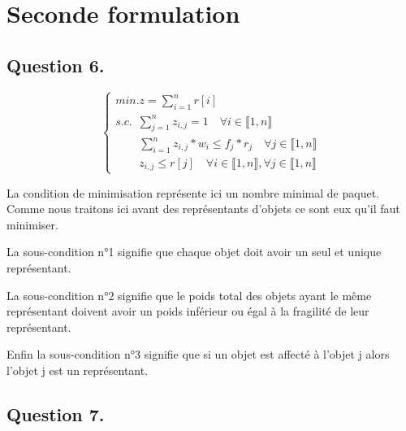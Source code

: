 \section{Seconde formulation}\label{sec:2_form}

\subsection*{Question 6.}

\begin{equation}
    \begin{cases}
        min. z = \sum_{i = 1}^{n} r[i]\\
        s.c. \hspace{6pt}\sum_{j = 1}^{n} z_{i,j} = 1 \hspace{12pt} \forall i \in \llbracket  1, n \rrbracket\\
        \hspace{25pt}\sum_{i = 1}^{n} z_{i, j}*w_i \leq f_j*r_j \hspace{12pt} \forall j \in \llbracket  1, n \rrbracket\\
        \hspace{25pt}z_{i, j} \leq r[j] \hspace{12pt} \forall i \in \llbracket  1, n \rrbracket, \forall j \in \llbracket  1, n \rrbracket
    \end{cases}
\end{equation}

La condition de minimisation représente ici un nombre minimal de paquet. Comme nous traitons ici avant des représentants d'objets ce sont eux qu'il faut minimiser.\vspace{12pt}

La sous-condition n°1 signifie que chaque objet doit avoir un seul et unique représentant.\vspace{12pt}

La sous-condition n°2 signifie que le poids total des objets ayant le même représentant doivent avoir un poids inférieur ou égal à la fragilité de leur représentant.\vspace{12pt}

Enfin la sous-condition n°3 signifie que si un objet est affecté à l'objet j alors l'objet j est un représentant.\vspace{12pt}


\subsection*{Question 7.}

